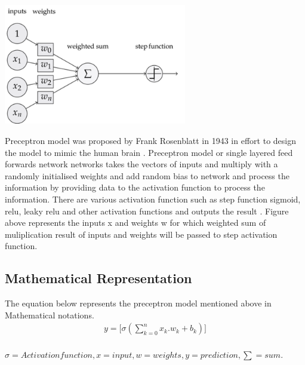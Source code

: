 
\begin{center}
    \includegraphics[width=0.6\textwidth]{Images/p_model.png} \\
\end{center}
\vspace{2mm}
Preceptron model was proposed by Frank Rosenblatt in 1943 in effort to design the model to 
mimic the human brain \citep*{939589}. Preceptron model or single layered feed forwards network 
networks takes the vectors of inputs and multiply with a randomly 
initialised weights and add random bias to network and process the information by providing data to the activation function to process the information.
There are various activation function such as  step function sigmoid, 
relu, leaky relu and other activation functions and outputs the result \citep{AGATONOVICKUSTRIN2000717}.
Figure above represents the inputs x and weights w for which weighted sum of muliplication result of 
inputs and weights will be passed to step activation function. 

\subsection*{Mathematical Representation }
\vspace{3mm}
{The equation below represents the preceptron model mentioned above in Mathematical notations.}
\begin{equation}
    \begin{split}
        y = \Big[\sigma(\sum_{k=0}^n x_k.w_k + b_k)\Big] \\
    \end{split}
\end{equation}

$ {\sigma = Activation function ,
        x = input , 
        w = weights ,
        y = prediction , 
        \sum = sum.
    } $ 
